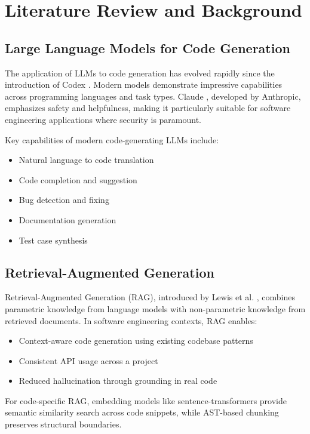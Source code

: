 \documentclass[12pt,a4paper]{article}
\begin{document}
\section{Literature Review and Background}

\subsection{Large Language Models for Code Generation}

The application of LLMs to code generation has evolved rapidly since the introduction of Codex \cite{chen2021codex}. Modern models demonstrate impressive capabilities across programming languages and task types. Claude \cite{anthropic2024claude}, developed by Anthropic, emphasizes safety and helpfulness, making it particularly suitable for software engineering applications where security is paramount.

Key capabilities of modern code-generating LLMs include:
\begin{itemize}
    \item Natural language to code translation
    \item Code completion and suggestion
    \item Bug detection and fixing
    \item Documentation generation
    \item Test case synthesis
\end{itemize}

\subsection{Retrieval-Augmented Generation}

Retrieval-Augmented Generation (RAG), introduced by Lewis et al. \cite{lewis2020rag}, combines parametric knowledge from language models with non-parametric knowledge from retrieved documents. In software engineering contexts, RAG enables:
\begin{itemize}
    \item Context-aware code generation using existing codebase patterns
    \item Consistent API usage across a project
    \item Reduced hallucination through grounding in real code
\end{itemize}

For code-specific RAG, embedding models like sentence-transformers provide semantic similarity search across code snippets, while AST-based chunking preserves structural boundaries.
\end{document}
